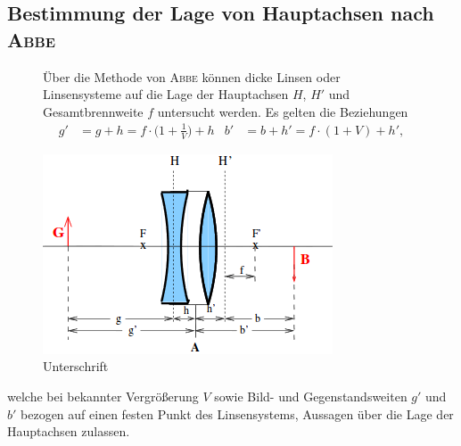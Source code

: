 \subsection{Bestimmung der Lage von Hauptachsen nach \texorpdfstring{\textsc{Abbe}}{Abbe}}
\label{sec:Theorie2}
\begin{figure}[h!]
	\begin{minipage}[r,t]{0.6\textwidth}
		Über die Methode von \textsc{Abbe} können dicke Linsen oder Linsensysteme auf die Lage der Hauptachsen $H$, $H'$ und Gesamtbrennweite $f$ untersucht werden. 
		Es gelten die Beziehungen
		\begin{subequations}
			\begin{align}
			g'&=g+h =f\cdot\biggl(1+\frac{1}{V}\biggr)+h
			\end{align}
			\begin{align}
			b'&=b+h' =f\cdot(1+V)+h',
			\end{align}
			\label{eq:abbe}
		\end{subequations}
	\end{minipage}
	\begin{minipage}[l,t]{0.4\textwidth}
		\hfill
		\includegraphics[width=\textwidth]{Bilder/dickelinseHELENA.png}
		\caption{Unterschrift}
		\label{fig:label}
	\end{minipage}
\end{figure}
welche bei bekannter Vergrößerung $V$ sowie Bild- und Gegenstandsweiten $g'$ und $b'$ bezogen auf einen festen Punkt des Linsensystems, Aussagen über die Lage der Hauptachsen zulassen. 
\vspace{1cm}

